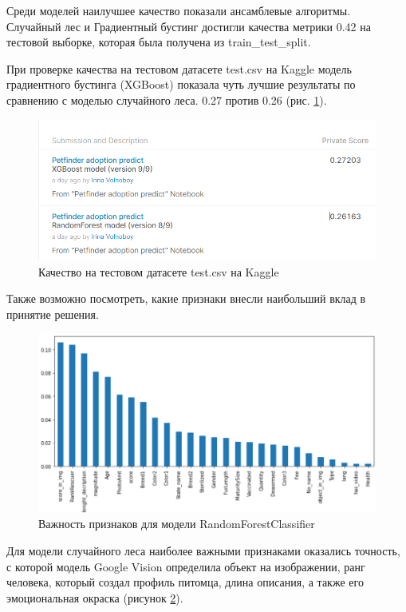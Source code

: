 \documentclass[14pt]{mmcs_article}
\begin{document}
Среди моделей наилучшее качество показали ансамблевые алгоритмы. Случайный лес и Градиентный бустинг достигли качества метрики 0.42 на тестовой выборке, которая была получена из train\_test\_split.

При проверке качества на тестовом датасете test.csv на Kaggle модель градиентного бустинга (XGBoost) показала чуть лучшие результаты по сравнению с моделью случайного леса. 0.27 против 0.26 (рис. \ref{kaggle:result}). 

\begin{figure}[H]
	\centering
	\includegraphics[scale=0.6]{kagglescore.png}
	\caption{Качество на тестовом датасете test.csv на Kaggle}\label{kaggle:result}
\end{figure}

Также возможно посмотреть, какие признаки внесли наибольший вклад в принятие решения. 

\begin{figure}[H]
	\centering
	\includegraphics[scale=0.7]{featuresrfc.png}
	\caption{Важность признаков для модели RandomForestClassifier}\label{kaggle:rfc}
\end{figure}

Для модели случайного леса наиболее важными признаками оказались точность, с которой модель Google Vision определила объект на изображении, ранг человека, который создал профиль питомца, длина описания, а также его эмоциональная окраска (рисунок \ref{kaggle:rfc}).
\end{document}
